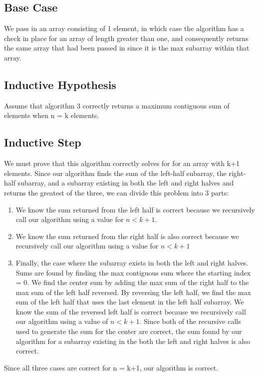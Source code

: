 \documentclass[11pt,letterpaper]{article}
\begin{document}
\subsection*{Base Case}
We pass in an array consisting of 1 element, in which case the algorithm has a check in place for an array of length greater than one, and consequently returns the same array that had been passed in since it is the max subarray within that array.

\subsection*{Inductive Hypothesis}
Assume that algorithm 3 correctly returns a maximum contiguous sum of elements when n = k elements. 

\subsection*{Inductive Step}
We must prove that this algorithm correctly solves for for an array with k+1 elements. Since our algorithm finds the sum of the left-half subarray, the right-half subarray, and a subarray existing in both the left and right halves and returns the greatest of the three, we can divide this problem into 3 parts:
\begin{enumerate}
\item We know the sum returned from the left half is correct because we recursively call our algorithm using a value for $n < k+1$.
\item We know the sum returned from the right half is also correct because we recursively call our algorithm using a value for $n < k+1$
\item Finally, the case where the subarray exists in both the left and right halves. Sums are found by finding the max contiguous sum where the starting index = 0. We find the center sum by adding the max sum of the right half to the max sum of the left half reversed. By reversing the left half, we find the max sum of the left half that uses the last element in the left half subarray. We know the sum of the reversed left half is correct because we recursively call our algorithm using a value of $n < k+1$. Since both of the recursive calls used to generate the sum for the center are correct, the sum found by our algorithm for a subarray existing in the both the left and right halves is also correct. 
\end{enumerate}
Since all three cases are correct for n = k+1, our algorithm is correct.
\end{document}
